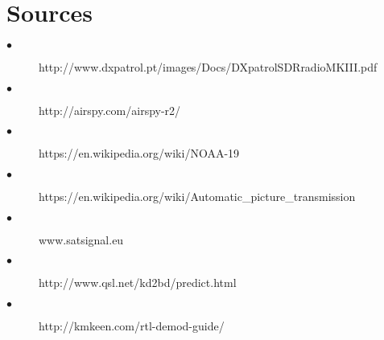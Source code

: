 \documentclass[12pt,fleqn]{book} %
\begin{document}
\part{Sources}

\appendix

\begin{description}
\item[$\bullet$] http://www.dxpatrol.pt/images/Docs/DXpatrolSDRradioMKIII.pdf
\item[$\bullet$] http://airspy.com/airspy-r2/
\item[$\bullet$] https://en.wikipedia.org/wiki/NOAA-19
\item[$\bullet$] https://en.wikipedia.org/wiki/Automatic\_picture\_transmission
\item[$\bullet$] www.satsignal.eu
\item[$\bullet$] http://www.qsl.net/kd2bd/predict.html
\item[$\bullet$] http://kmkeen.com/rtl-demod-guide/
\end{description} 
\end{document}
